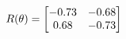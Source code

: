 \documentclass[preview]{standalone}
\begin{document}
\begin{align*}
\special{dvisvgm:raw <g id='unique000'>}R(\theta) = \begin{bmatrix}-0.73 & -0.68\\0.68 & -0.73\end{bmatrix}\special{dvisvgm:raw </g>}
\end{align*}
\end{document}
